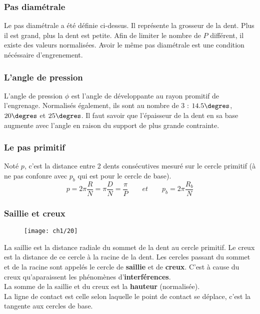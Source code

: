 \subsubsection{Pas diamétrale}
Le pas diamétrale a été définie ci-dessus. Il représente la grosseur de la dent. Plus il est grand, plus la dent est petite. Afin de limiter le nombre de $P$ différent, il existe des valeurs normalisées. Avoir le même pas diamétrale est une condition nécéssaire d'engrenement. 
		
\subsubsection{L'angle de pression}		
L'angle de pression $\phi$ est l'angle de développante au rayon promitif de l'engrenage. Normalisés également, ils sont au nombre de 3 : $14.5\degres$, $20\degres$ et $25\degres$. Il faut savoir que l'épaisseur de la dent en sa base augmente avec l'angle en raison du support de plus grande contrainte. 
		
\subsubsection{Le pas primitif}
Noté $p$, c'est la distance entre 2 dents consécutives mesuré sur le cercle primitif (à ne pas confonre avec $p_b$ qui est pour le cercle de base). 
\begin{equation}
	p = 2\pi \frac{R}{N} = \pi \frac{D}{N} = \frac{\pi}{P} \qquad et \qquad p_b = 2\pi \frac{R_b}{N}
	\label{eq:1.13}
\end{equation}
		
\subsubsection{Saillie et creux}
\begin{wrapfigure}[7]{l}{5.5cm}
	\vspace{-5mm}
	\texttt{[image: ch1/20]}
\end{wrapfigure}		
La saillie est la distance radiale du sommet de la dent au cercle primitif. Le creux est la distance de ce cercle à la racine de la dent. Les cercles passant du sommet et de la racine sont appelés le cercle de \textbf{saillie} et de \textbf{creux}. C'est à cause du creux qu'aparaissent les phénomènes d'\textbf{interférences}. \\
La somme de la saillie et du creux est la \textbf{hauteur} (normalisée). \\
La ligne de contact est celle selon laquelle le point de contact se déplace, c'est la tangente aux cercles de base. 
		
